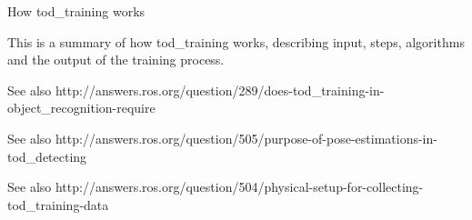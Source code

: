 

How tod\_training works

This is a summary of how tod\_training works, describing input, steps,
algorithms and the output of the training process.

See also http://answers.ros.org/question/289/does-tod\_training-in-object\_recognition-require

See also http://answers.ros.org/question/505/purpose-of-pose-estimations-in-tod\_detecting

See also http://answers.ros.org/question/504/physical-setup-for-collecting-tod\_training-data


